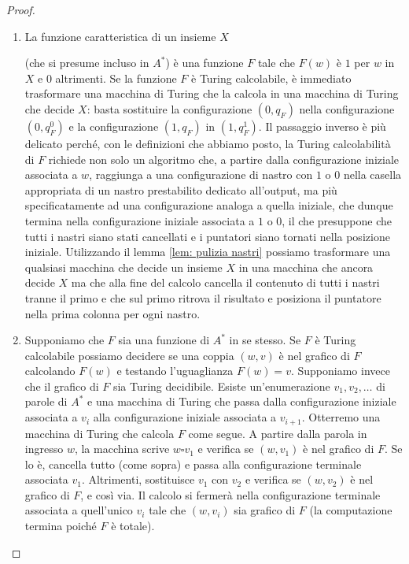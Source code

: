 \begin{proof}\
\begin{enumerate}
    \item[i)] La funzione caratteristica di un insieme $X$ 
    
    (che si presume incluso in $A^*$) è una funzione $F$ tale che $F(w)$ è $1$ per $w$ in $X$ e $0$ altrimenti. Se la funzione $F$ è Turing calcolabile, è immediato trasformare una macchina di Turing che la calcola in una macchina di Turing che decide $X$: basta sostituire la configurazione $(0,q_F)$ nella configurazione $(0,q_F^0)$ e la configurazione $(1,q_F)$ in $(1,q_F^1)$. Il passaggio inverso è più delicato perché, con le definizioni che abbiamo posto, la Turing calcolabilità di $F$ richiede non solo un algoritmo che, a partire dalla configurazione iniziale associata a $w$, raggiunga a una configurazione di nastro con $1$ o $0$ nella casella appropriata di un nastro prestabilito dedicato all'output, ma più specificatamente ad una configurazione analoga a quella iniziale, che dunque termina nella configurazione iniziale associata a $1$ o $0$, il che presuppone che tutti i nastri siano stati cancellati e i puntatori siano tornati nella posizione iniziale. Utilizzando il lemma \ref{lem: pulizia nastri} possiamo trasformare una qualsiasi macchina che decide un insieme $X$ in una macchina che ancora decide $X$ ma che alla fine del calcolo cancella il contenuto di tutti i nastri tranne il primo e che sul primo ritrova il risultato e posiziona il puntatore nella prima colonna per ogni nastro.
    \item[ii)] Supponiamo che $F$ sia una funzione di $A^*$ in se stesso. Se $F$ è Turing calcolabile possiamo decidere se una coppia $(w,v)$ è nel grafico di $F$ calcolando $F(w)$ e testando l'uguaglianza $F(w)=v$. Supponiamo invece che il grafico di $F$ sia Turing decidibile. Esiste un'enumerazione $v_1,v_2,\dots$ di parole di $A^*$ e una macchina di Turing che passa dalla configurazione iniziale associata a $v_i$ alla configurazione iniziale associata a $v_{i+1}$. Otterremo una macchina di Turing che calcola $F$ come segue. A partire dalla parola in ingresso $w$, la macchina scrive $w\square v_1$ e verifica se $(w,v_1)$ è nel grafico di $F$. Se lo è, cancella tutto (come sopra) e passa alla configurazione terminale associata $v_1$. Altrimenti, sostituisce $v_1$ con $v_2$ e verifica se $(w,v_2)$ è nel grafico di $F$, e così via. Il calcolo si fermerà nella configurazione terminale associata a quell'unico $v_i$ tale che $(w,v_i)$ sia grafico di $F$ (la computazione termina poiché $F$ è totale).
\end{enumerate}
\end{proof}

